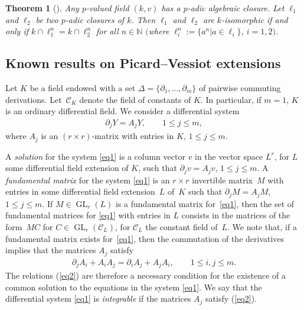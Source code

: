 \documentclass[10pt,a4paper]{amsart}
\numberwithin{equation}{section}
\newtheorem{Theorem}{Theorem}[section]
\newcommand{\N}{\mathbb{N}}
\def \GL{\operatorname{GL}}
\begin{document}
\begin{Theorem}[{\cite[Corollary~3.11]{PR}}] Any $p$-valued field $(k,v)$ has a
$p$-adic algebraic closure. Let $\ell_1$ and $\ell_2$ be two $p$-adic closures of $k$. Then $\ell_1$ and $\ell_2$ are $k$-isomorphic if and only if
$k\cap \ell_1^n=k\cap \ell_2^n$ for all $n \in \N$ $($where $\ell_i^n:=\{a^n| a\in \ell_i\}$, $i=1,2)$.
\end{Theorem}

\subsection{Known results on Picard--Vessiot extensions}

Let $K$ be a field endowed with a set $\Delta=\{\partial_1,\dots,\partial_m \}$ of pairwise commuting derivations. Let~$\mathcal{C}_K$ denote the field of constants of $K$. In particular, if $m=1$, $K$ is an ordinary differential field. We consider a differential system
\begin{gather}\label{eq1}
\partial_j Y=A_j Y, \qquad 1\leq j \leq m,
\end{gather}
where $A_j$ is an $(r \times r)$-matrix with entries in $K$, $1\leq j \leq m$.

A \emph{solution} for the system \eqref{eq1} is a column vector $v$ in the vector space $L^r$, for $L$ some differential field extension of $K$, such that $\partial_j v= A_j v$, $1\leq j \leq m$. A \emph{fundamental matrix} for the system \eqref{eq1} is an $r\times r$ invertible matrix~$M$ with entries in some differential field extension~$L$ of~$K$ such that $\partial_j M= A_j M$, $1\leq j \leq m$. If $M \in \GL_r(L)$ is a fundamental matrix for~\eqref{eq1}, then the set of fundamental matrices for \eqref{eq1} with entries in $L$ consists in the matrices of the form~$MC$ for $C \in \GL_r(\mathcal{C}_L)$, for $\mathcal{C}_L$ the constant field of~$L$. We note that, if a fundamental matrix exists for~\eqref{eq1}, then the commutation of the derivatives implies that the matrices $A_j$ satisfy
\begin{gather}\label{eq2}
\partial_j A_i+A_i A_j=\partial_i A_j + A_j A_i, \qquad
1 \leq i,j\leq m.
\end{gather}
The relations (\ref{eq2}) are therefore a necessary condition for the existence of a common solution to the equations in the system \eqref{eq1}. We say that the differential system \eqref{eq1} is \emph{integrable} if the matrices $A_j$ satisfy (\ref{eq2}).
\end{document}
